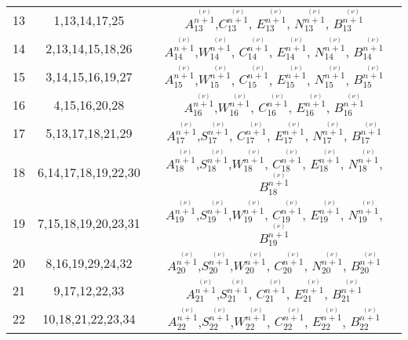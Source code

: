 \begin{center}
\begin{longtable}[htbp]{c c c}
		13	&	1,13,14,17,25	&	$A^{\stackrel{(\nu)}{n+1}}_{13}$,$C^{\stackrel{(\nu)}{n+1}}_{13}$, $E^{\stackrel{(\nu)}{n+1}}_{13}$, $N^{\stackrel{(\nu)}{n+1}}_{13}$, $B^{\stackrel{(\nu)}{n+1}}_{13}$	\\
		14	&	2,13,14,15,18,26	&	$A^{\stackrel{(\nu)}{n+1}}_{14}$,$W^{\stackrel{(\nu)}{n+1}}_{14}$, $C^{\stackrel{(\nu)}{n+1}}_{14}$, $E^{\stackrel{(\nu)}{n+1}}_{14}$, $N^{\stackrel{(\nu)}{n+1}}_{14}$, $B^{\stackrel{(\nu)}{n+1}}_{14}$	\\
		15	&	3,14,15,16,19,27	&	$A^{\stackrel{(\nu)}{n+1}}_{15}$,$W^{\stackrel{(\nu)}{n+1}}_{15}$, $C^{\stackrel{(\nu)}{n+1}}_{15}$, $E^{\stackrel{(\nu)}{n+1}}_{15}$, $N^{\stackrel{(\nu)}{n+1}}_{15}$, $B^{\stackrel{(\nu)}{n+1}}_{15}$	\\
		16	&	4,15,16,20,28	&	$A^{\stackrel{(\nu)}{n+1}}_{16}$,$W^{\stackrel{(\nu)}{n+1}}_{16}$, $C^{\stackrel{(\nu)}{n+1}}_{16}$, $E^{\stackrel{(\nu)}{n+1}}_{16}$, $B^{\stackrel{(\nu)}{n+1}}_{16}$	\\
		17	&	5,13,17,18,21,29	&	$A^{\stackrel{(\nu)}{n+1}}_{17}$,$S^{\stackrel{(\nu)}{n+1}}_{17}$, $C^{\stackrel{(\nu)}{n+1}}_{17}$, $E^{\stackrel{(\nu)}{n+1}}_{17}$, $N^{\stackrel{(\nu)}{n+1}}_{17}$, $B^{\stackrel{(\nu)}{n+1}}_{17}$	\\
		18	&	6,14,17,18,19,22,30	&	$A^{\stackrel{(\nu)}{n+1}}_{18}$,$S^{\stackrel{(\nu)}{n+1}}_{18}$,$W^{\stackrel{(\nu)}{n+1}}_{18}$, $C^{\stackrel{(\nu)}{n+1}}_{18}$, $E^{\stackrel{(\nu)}{n+1}}_{18}$, $N^{\stackrel{(\nu)}{n+1}}_{18}$, $B^{\stackrel{(\nu)}{n+1}}_{18}$	\\
		19	&	7,15,18,19,20,23,31	&	$A^{\stackrel{(\nu)}{n+1}}_{19}$,$S^{\stackrel{(\nu)}{n+1}}_{19}$,$W^{\stackrel{(\nu)}{n+1}}_{19}$, $C^{\stackrel{(\nu)}{n+1}}_{19}$, $E^{\stackrel{(\nu)}{n+1}}_{19}$, $N^{\stackrel{(\nu)}{n+1}}_{19}$, $B^{\stackrel{(\nu)}{n+1}}_{19}$	\\
		20	&	8,16,19,29,24,32	&	$A^{\stackrel{(\nu)}{n+1}}_{20}$,$S^{\stackrel{(\nu)}{n+1}}_{20}$,$W^{\stackrel{(\nu)}{n+1}}_{20}$, $C^{\stackrel{(\nu)}{n+1}}_{20}$, $N^{\stackrel{(\nu)}{n+1}}_{20}$, $B^{\stackrel{(\nu)}{n+1}}_{20}$	\\
		21	&	9,17,12,22,33	&	$A^{\stackrel{(\nu)}{n+1}}_{21}$,$S^{\stackrel{(\nu)}{n+1}}_{21}$, $C^{\stackrel{(\nu)}{n+1}}_{21}$, $E^{\stackrel{(\nu)}{n+1}}_{21}$, $B^{\stackrel{(\nu)}{n+1}}_{21}$	\\
		22	&	10,18,21,22,23,34	&	$A^{\stackrel{(\nu)}{n+1}}_{22}$,$S^{\stackrel{(\nu)}{n+1}}_{22}$,$W^{\stackrel{(\nu)}{n+1}}_{22}$, $C^{\stackrel{(\nu)}{n+1}}_{22}$, $E^{\stackrel{(\nu)}{n+1}}_{22}$, $B^{\stackrel{(\nu)}{n+1}}_{22}$	\\

\end{longtable}
\end{center}
